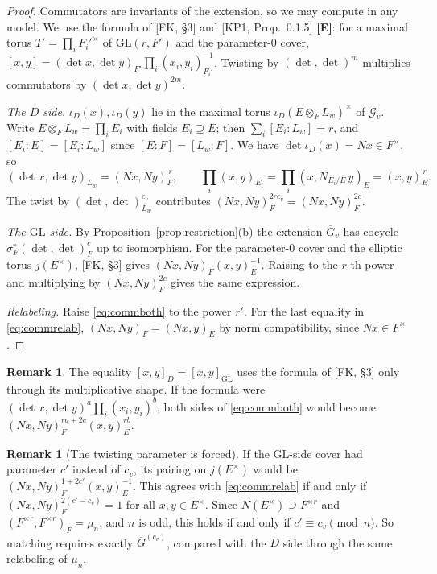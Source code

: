 \documentclass[12pt]{article}
\newcommand{\ov}[1]{\overline{#1}}
\newcommand{\GL}{\mathrm{GL}}
\newcommand{\Gb}{\ov{G}}
\newcommand{\cG}{\mathcal{G}}
\newcommand{\iD}{\iota_D}
\newcommand{\Ev}{\textbf{[E]}}
\theoremstyle{plain}
\theoremstyle{definition}
\newtheorem{remark}[theorem]{Remark}
\begin{document}
\begin{proof}
Commutators are invariants of the extension, so we may compute in any model. We use the formula of [FK, \S3] and [KP1, Prop.~0.1.5] \Ev: for a maximal torus $T'=\prod_iF_i'^\times$ of $\GL(r,F')$ and the parameter-$0$ cover, $[x,y]=(\det x,\det y)_{F'}\prod_i(x_i,y_i)_{F_i'}^{-1}$. Twisting by $(\det,\det)^{m}$ multiplies commutators by $(\det x,\det y)^{2m}$.

\emph{The $D$ side.} $\iD(x),\iD(y)$ lie in the maximal torus $\iD(E\otimes_FL_w)^\times$ of $\cG_v$. Write $E\otimes_FL_w=\prod_iE_i$ with fields $E_i\supseteq E$; then $\sum_i[E_i:L_w]=r$, and $[E_i:E]=[E_i:L_w]$ since $[E:F]=[L_w:F]$. We have $\det\iD(x)=Nx\in F^\times$, so
\[ (\det x,\det y)_{L_w}=(Nx,Ny)_F^{\,r},\qquad \prod_i(x,y)_{E_i}=\prod_i(x,N_{E_i/E}\,y)_E=(x,y)_E^{\,r}. \]
The twist by $(\det,\det)_{L_w}^{c_v}$ contributes $(Nx,Ny)_F^{2rc_v}=(Nx,Ny)_F^{2c}$.

\emph{The $\GL$ side.} By Proposition~\ref{prop:restriction}(b) the extension $\Gb_v$ has cocycle $\sigma_F^r(\det,\det)_F^c$ up to isomorphism. For the parameter-$0$ cover and the elliptic torus $j(E^\times)$, [FK, \S3] gives $(Nx,Ny)_F(x,y)_E^{-1}$. Raising to the $r$-th power and multiplying by $(Nx,Ny)_F^{2c}$ gives the same expression.

\emph{Relabeling.} Raise \eqref{eq:commboth} to the power $r'$. For the last equality in \eqref{eq:commrelab}, $(Nx,Ny)_F=(Nx,y)_E$ by norm compatibility, since $Nx\in F^\times$.
\end{proof}

\begin{remark}\label{rem:robust}
The equality $[x,y]_D=[x,y]_{\GL}$ uses the formula of [FK, \S3] only through its multiplicative shape. If the formula were $(\det x,\det y)^{a}\prod_i(x_i,y_i)^{b}$, both sides of \eqref{eq:commboth} would become $(Nx,Ny)_F^{ra+2c}(x,y)_E^{rb}$.
\end{remark}

\begin{remark}[The twisting parameter is forced]\label{rem:forced}
If the $\GL$-side cover had parameter $c'$ instead of $c_v$, its pairing on $j(E^\times)$ would be $(Nx,Ny)_F^{1+2c'}(x,y)_E^{-1}$. This agrees with \eqref{eq:commrelab} if and only if $(Nx,Ny)_F^{2(c'-c_v)}=1$ for all $x,y\in E^\times$. Since $N(E^\times)\supseteq F^{\times r}$ and $(F^{\times r},F^{\times r})_F=\mu_n$, and $n$ is odd, this holds if and only if $c'\equiv c_v\pmod n$. So matching requires exactly $\Gb^{(c_v)}$, compared with the $D$ side through the same relabeling of $\mu_n$.
\end{remark}
\end{document}
